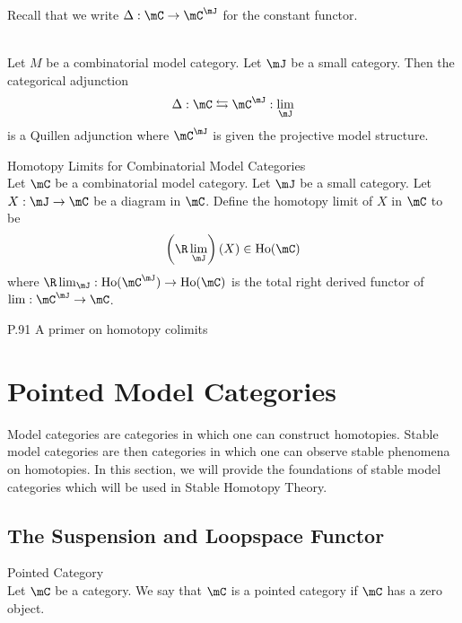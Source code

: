 \documentclass[a4paper]{article}
\begin{document}
Recall that we write $\Delta:\mC\to\mC^\mJ$ for the constant functor. 

\begin{prp}{}{}\\ Let $M$ be a combinatorial model category. Let $\mJ$ be a small category. Then the categorical adjunction $$\Delta:\mC\leftrightarrows\mC^\mJ:\lim_\mJ$$ is a Quillen adjunction where $\mC^\mJ$ is given the projective model structure. 
\end{prp}

\begin{defn}{Homotopy Limits for Combinatorial Model Categories}{}\\ Let $\mC$ be a combinatorial model category. Let $\mJ$ be a small category. Let $X:\mJ\to\mC$ be a diagram in $\mC$. Define the homotopy limit of $X$ in $\mC$ to be $$\left(\R\lim_\mJ\right)(X)\in\text{Ho}(\mC)$$ where $\R\lim_\mJ:\text{Ho}(\mC^\mJ)\to\text{Ho}(\mC)$ is the total right derived functor of $\lim:\mC^\mJ\to\mC$. 
\end{defn}

P.91 A primer on homotopy colimits


\pagebreak
\section{Pointed Model Categories}
Model categories are categories in which one can construct homotopies. Stable model categories are then categories in which one can observe stable phenomena on homotopies. In this section, we will provide the foundations of stable model categories which will be used in Stable Homotopy Theory. 

\subsection{The Suspension and Loopspace Functor}
\begin{defn}{Pointed Category}{}\\ Let $\mC$ be a category. We say that $\mC$ is a pointed category if $\mC$ has a zero object. 
\end{defn}
\end{document}
